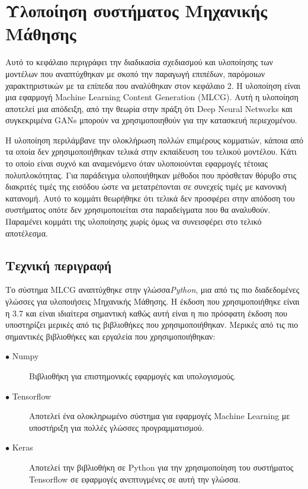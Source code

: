 \thispagestyle{empty}

\chapter{Υλοποίηση συστήματος Μηχανικής Μάθησης}

Αυτό το κεφάλαιο περιγράφει την διαδικασία σχεδιασμού και υλοποίησης των μοντέλων που αναπτύχθηκαν με σκοπό την παραγωγή επιπέδων, παρόμοιων χαρακτηριστικών με τα επίπεδα που αναλύθηκαν στον κεφάλαιο 2. Η υλοποίηση είναι μια εφαρμογή Machine Learning Content Generation (MLCG). Αυτή η υλοποίηση αποτελεί μια απόδειξη, από την θεωρία στην πράξη ότι Deep Neural Networks και συγκεκριμένα GANs μπορούν να χρησιμοποιηθούν για την κατασκευή περιεχομένου.
\par
Η υλοποίηση περιλάμβανε την ολοκλήρωση πολλών επιμέρους κομματιών, κάποια από τα οποία δεν χρησιμοποιήθηκαν τελικά στην εκπαίδευση του τελικού μοντέλου. Κάτι το οποίο είναι συχνό και αναμενόμενο όταν υλοποιούνται εφαρμογές τέτοιας πολυπλοκότητας. Για παράδειγμα υλοποιήθηκαν μέθοδοι που πρόσθεταν θόρυβο στις διακριτές τιμές της εισόδου ώστε να μετατρέπονται σε συνεχείς τιμές με κανονική κατανομή. Αυτό το κομμάτι θεωρήθηκε ότι τελικά δεν προσφέρει στην απόδοση του συστήματος οπότε δεν χρησιμοποιείται στα παραδείγματα που θα αναλυθούν. Παραμένει κομμάτι της υλοποίησης χωρίς όμως να συνεισφέρει στο τελικό αποτέλεσμα.

\section{Τεχνική περιγραφή}
Το σύστημα MLCG αναπτύχθηκε στην γλώσσα\textit{Python}, μια από τις πιο διαδεδομένες γλώσσες για υλοποιήσεις Μηχανικής Μάθησης. Η έκδοση που χρησιμοποιήθηκε είναι η 3.7 και είναι ιδιαίτερα σημαντική καθώς αυτή είναι η πιο πρόσφατη έκδοση που υποστηρίζει μερικές από τις βιβλιοθήκες που χρησιμοποιήθηκαν. 
Μερικές από τις πιο σημαντικές βιβλιοθήκες και εργαλεία που χρησιμοποιήθηκαν:

\begin{description}
\item[$\bullet$ Numpy] Βιβλιοθήκη για επιστημονικές εφαρμογές και υπολογισμούς.
\item[$\bullet$ Tensorflow] Αποτελεί ένα ολοκληρωμένο σύστημα για εφαρμογές Machine Learning με υποστήριξη για πολλές γλώσσες προγραμματισμού. 
\item[$\bullet$ Keras] Αποτελεί την βιβλιοθήκη σε Python για την χρησιμοποίηση του συστήματος Tensorflow σε εφαρμογές ανεπτυγμένες σε αυτή την γλώσσα.
\end{description}



